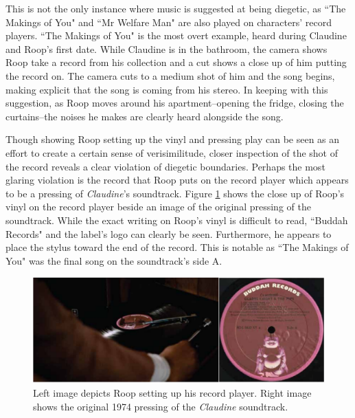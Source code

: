 This is not the only instance where music is suggested at being diegetic, as ``The Makings of You" and ``Mr Welfare Man" are also played on characters' record players.
``The Makings of You" is the most overt example, heard during Claudine and Roop's first date.
While Claudine is in the bathroom, the camera shows Roop take a record from his collection and a cut shows a close up of him putting the record on.
The camera cuts to a medium shot of him and the song begins, making explicit that the song is coming from his stereo.
In keeping with this suggestion, as Roop moves around his apartment–opening the fridge, closing the curtains–the noises he makes are clearly heard alongside the song.

Though showing Roop setting up the vinyl and pressing play can be seen as an effort to create a certain sense of verisimilitude, closer inspection of the shot of the record reveals a clear violation of diegetic boundaries.
Perhaps the most glaring violation is the record that Roop puts on the record player which appears to be a pressing of \textit{Claudine}'s soundtrack.
Figure \ref{fig:claudine-makings-record} shows the close up of Roop's vinyl on the record player beside an image of the original pressing of the soundtrack.
While the exact writing on Roop's vinyl is difficult to read, ``Buddah Records" and the label's logo can clearly be seen. 
Furthermore, he appears to place the stylus toward the end of the record.
This is notable as ``The Makings of You" was the final song on the soundtrack's side A.


\begin{figure}
    \centering
    \includegraphics[width=1\linewidth]{img/claudine-makings-record.pdf}
    \caption{Left image depicts Roop setting up his record player. Right image shows the original 1974 pressing of the \textit{Claudine} soundtrack.\autocite[Image of record is taken from a listing available at HHV Records][]{noauthor_ost_nodate}}
    \label{fig:claudine-makings-record}
\end{figure}

